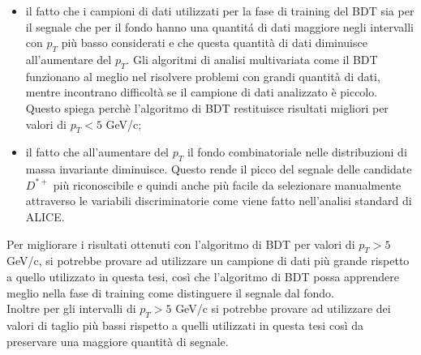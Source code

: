     
    
    \begin{itemize}
        \item il fatto che i campioni di dati utilizzati per la fase di training del BDT sia per il segnale che per il fondo hanno una quantit\'a di dati maggiore negli intervalli con $p_T$ pi\`u basso considerati e che questa quantit\`a di dati diminuisce all'aumentare del $p_T$. Gli algoritmi di analisi multivariata come il BDT funzionano al meglio nel risolvere problemi con grandi quantit\`a di dati, mentre incontrano difficolt\`a se il campione di dati analizzato \`e piccolo. Questo spiega perch\`e l'algoritmo di BDT restituisce risultati migliori per valori di $p_T < 5$ GeV/c;
        \item il fatto che all'aumentare del $p_T$ il fondo combinatoriale nelle distribuzioni di massa invariante diminuisce. Questo rende il picco del segnale delle candidate $D^{*+}$ pi\`u riconoscibile e quindi anche pi\`u facile da selezionare manualmente attraverso le variabili discriminatorie come viene fatto nell'analisi standard di ALICE. 
    \end{itemize}
 
\fi 
    
Per migliorare i risultati ottenuti con l'algoritmo di BDT per valori di $p_T > 5$ GeV/c, si potrebbe provare ad utilizzare un campione di dati pi\`u grande rispetto a quello utilizzato in questa tesi, cos\`i che l'algoritmo di BDT possa apprendere meglio nella fase di training come distinguere il segnale dal fondo. 
\\Inoltre per gli intervalli di $p_T > 5$ GeV/c si potrebbe provare ad utilizzare dei valori di taglio pi\`u bassi rispetto a quelli utilizzati in questa tesi cos\`i da preservare una maggiore quantit\`a di segnale.
    

